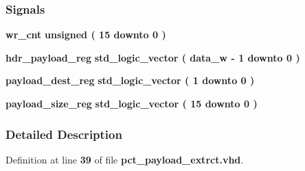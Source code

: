 \subsubsection*{Signals}
 \begin{DoxyCompactItemize}
\item 
{\bf wr\+\_\+cnt} {\bfseries \textcolor{comment}{unsigned}\textcolor{vhdlchar}{ }\textcolor{vhdlchar}{(}\textcolor{vhdlchar}{ }\textcolor{vhdlchar}{ } \textcolor{vhdldigit}{15} \textcolor{vhdlchar}{ }\textcolor{keywordflow}{downto}\textcolor{vhdlchar}{ }\textcolor{vhdlchar}{ } \textcolor{vhdldigit}{0} \textcolor{vhdlchar}{ }\textcolor{vhdlchar}{)}\textcolor{vhdlchar}{ }} 
\item 
{\bf hdr\+\_\+payload\+\_\+reg} {\bfseries \textcolor{comment}{std\+\_\+logic\+\_\+vector}\textcolor{vhdlchar}{ }\textcolor{vhdlchar}{(}\textcolor{vhdlchar}{ }\textcolor{vhdlchar}{ }\textcolor{vhdlchar}{ }\textcolor{vhdlchar}{ }{\bfseries {\bf data\+\_\+w}} \textcolor{vhdlchar}{-\/}\textcolor{vhdlchar}{ } \textcolor{vhdldigit}{1} \textcolor{vhdlchar}{ }\textcolor{keywordflow}{downto}\textcolor{vhdlchar}{ }\textcolor{vhdlchar}{ } \textcolor{vhdldigit}{0} \textcolor{vhdlchar}{ }\textcolor{vhdlchar}{)}\textcolor{vhdlchar}{ }} 
\item 
{\bf payload\+\_\+dest\+\_\+reg} {\bfseries \textcolor{comment}{std\+\_\+logic\+\_\+vector}\textcolor{vhdlchar}{ }\textcolor{vhdlchar}{(}\textcolor{vhdlchar}{ }\textcolor{vhdlchar}{ } \textcolor{vhdldigit}{1} \textcolor{vhdlchar}{ }\textcolor{keywordflow}{downto}\textcolor{vhdlchar}{ }\textcolor{vhdlchar}{ } \textcolor{vhdldigit}{0} \textcolor{vhdlchar}{ }\textcolor{vhdlchar}{)}\textcolor{vhdlchar}{ }} 
\item 
{\bf payload\+\_\+size\+\_\+reg} {\bfseries \textcolor{comment}{std\+\_\+logic\+\_\+vector}\textcolor{vhdlchar}{ }\textcolor{vhdlchar}{(}\textcolor{vhdlchar}{ }\textcolor{vhdlchar}{ } \textcolor{vhdldigit}{15} \textcolor{vhdlchar}{ }\textcolor{keywordflow}{downto}\textcolor{vhdlchar}{ }\textcolor{vhdlchar}{ } \textcolor{vhdldigit}{0} \textcolor{vhdlchar}{ }\textcolor{vhdlchar}{)}\textcolor{vhdlchar}{ }} 
\end{DoxyCompactItemize}


\subsubsection{Detailed Description}


Definition at line {\bf 39} of file {\bf pct\+\_\+payload\+\_\+extrct.\+vhd}.



